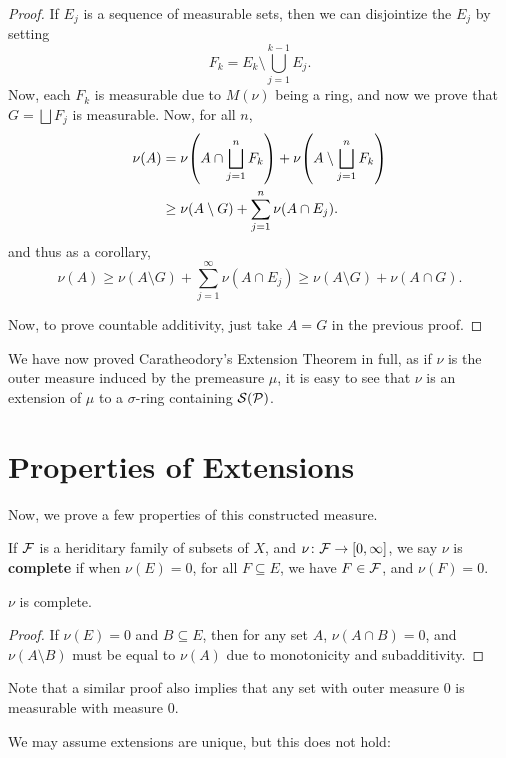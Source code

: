 \begin{proof}
    If $E_j$ is a sequence of measurable sets, then we can disjointize the $E_j$ by setting \[F_k = E_k \setminus \bigcup_{j = 1}^{k - 1} E_j.\] Now, each $F_k$ is measurable due to $M(\nu)$ being a ring, and now we prove that $G = \bigsqcup F_j$ is measurable. Now, for all $n$, \begin{align*}
        \nu(A) &= \nu\qty(A \cap \bigsqcup_{j = 1}^n F_k) + \nu\qty(A \setminus \bigsqcup_{j = 1}^n F_k)\\ 
        &\ge \nu(A \setminus G) + \sum_{j = 1}^n \nu(A \cap E_j).
    \end{align*}
    and thus as a corollary, \[\nu(A) \ge \nu(A \setminus G) + \sum_{j = 1}^\infty \nu(A \cap E_j) \ge \nu(A \setminus G) + \nu(A \cap G).\]

    Now, to prove countable additivity, just take $A = G$ in the previous proof.
\end{proof}

We have now proved Caratheodory's Extension Theorem in full, as if $\nu$ is the outer measure induced by the premeasure $\mu$, it is easy to see that $\nu$ is an extension of $\mu$ to a $\sigma$-ring containing $\mathcal S(\mathcal P)$. 

\section{Properties of Extensions}
Now, we prove a few properties of this constructed measure.

\begin{definition}
    If $\mathcal F$ is a heriditary family of subsets of $X$, and $\nu \colon \mathcal F \to [0, \infty]$, we say $\nu$ is \textbf{complete} if when $\nu(E) = 0$, for all $F \subseteq E$, we have $F \in \mathcal F$, and $\nu(F) = 0$.
\end{definition}
\begin{proposition}
    $\nu$ is complete.
\end{proposition}

\begin{proof}
    If $\nu(E) = 0$ and $B \subseteq E$, then for any set $A$, $\nu(A \cap B) = 0$, and $\nu(A \setminus B)$  must be equal to $\nu(A)$ due to monotonicity and subadditivity.
\end{proof}

Note that a similar proof also implies that any set with outer measure $0$ is measurable with measure $0$.

We may assume extensions are unique, but this does not hold:

